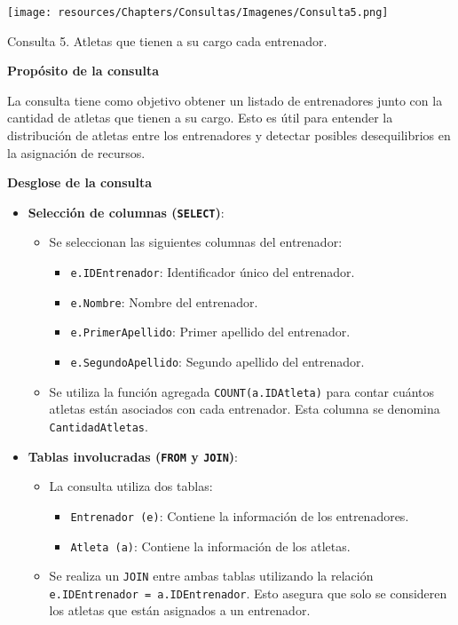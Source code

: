 \begin{center}
    \texttt{[image: resources/Chapters/Consultas/Imagenes/Consulta5.png]} 
    
   Consulta 5. Atletas que tienen a su cargo cada entrenador. 
\end{center}

\textbf{Propósito de la consulta}

La consulta tiene como objetivo obtener un listado de entrenadores junto con la cantidad de atletas que tienen a su cargo. Esto es útil para entender la distribución de atletas entre los entrenadores y detectar posibles desequilibrios en la asignación de recursos.

\textbf{Desglose de la consulta}

\begin{itemize}
   \item \textbf{Selección de columnas (\texttt{SELECT})}:
   \begin{itemize}
       \item Se seleccionan las siguientes columnas del entrenador:
       \begin{itemize}
           \item \texttt{e.IDEntrenador}: Identificador único del entrenador.
           \item \texttt{e.Nombre}: Nombre del entrenador.
           \item \texttt{e.PrimerApellido}: Primer apellido del entrenador.
           \item \texttt{e.SegundoApellido}: Segundo apellido del entrenador.
       \end{itemize}
       \item Se utiliza la función agregada \texttt{COUNT(a.IDAtleta)} para contar cuántos atletas están asociados con cada entrenador. Esta columna se denomina \texttt{CantidadAtletas}.
   \end{itemize}
   
   \item \textbf{Tablas involucradas (\texttt{FROM} y \texttt{JOIN})}:
   \begin{itemize}
       \item La consulta utiliza dos tablas:
       \begin{itemize}
           \item \texttt{Entrenador (e)}: Contiene la información de los entrenadores.
           \item \texttt{Atleta (a)}: Contiene la información de los atletas.
       \end{itemize}
       \item Se realiza un \texttt{JOIN} entre ambas tablas utilizando la relación \texttt{e.IDEntrenador = a.IDEntrenador}. Esto asegura que solo se consideren los atletas que están asignados a un entrenador.
   \end{itemize}
   

\end{itemize}
